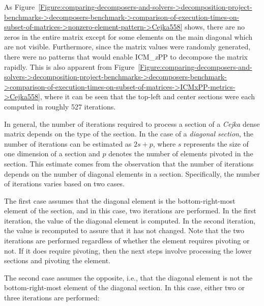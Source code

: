 As Figure~\ref{Figure:comparing-decomposers-and-solvers->decomposition-project-benchmarks->decomposers-benchmark->comparison-of-execution-times-on-subset-of-matrices->nonzero-element-pattern->Cejka558} shows, there are no zeros in the entire matrix except for some elements on the main diagonal which are not visible.
Furthermore, since the matrix values were randomly generated, there were no patterns that would enable ICM\_\textit{x}PP to decompose the matrix rapidly.
This is also apparent from Figure~\ref{Figure:comparing-decomposers-and-solvers->decomposition-project-benchmarks->decomposers-benchmark->comparison-of-execution-times-on-subset-of-matrices->ICMxPP-metrics->Cejka558}, where it can be seen that the top-left and center sections were each computed in roughly 527 iterations.

In general, the number of iterations required to process a section of a \textit{Cejka} dense matrix depends on the type of the section.
In the case of a \textit{diagonal section}, the number of iterations can be estimated as $2s + p$, where $s$ represents the size of one dimension of a section and $p$ denotes the number of elements pivoted in the section.
This estimate comes from the observation that the number of iterations depends on the number of diagonal elements in a section.
Specifically, the number of iterations varies based on two cases.

The first case assumes that the diagonal element is the bottom-right-most element of the section, and in this case, two iterations are performed.
In the first iteration, the value of the diagonal element is computed.
In the second iteration, the value is recomputed to assure that it has not changed.
Note that the two iterations are performed regardless of whether the element requires pivoting or not.
If it does require pivoting, then the next steps involve processing the lower sections and pivoting the element.

The second case assumes the opposite, i.e., that the diagonal element is not the bottom-right-most element of the diagonal section.
In this case, either two or three iterations are performed:


